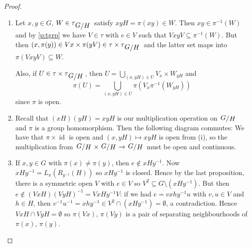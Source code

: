 \documentclass[11pt, a4paper]{memoir}
\theoremstyle{change}
\theoremstyle{plain}
\theoremstyle{nonumberplain}
\newtheorem{proof}{Proof}
\DeclareMathOperator{\id}{id}
\newcommand{\quot}[2]{\mathchoice{\left.\raisebox{0.14em}{$#1$}\middle/\raisebox{-0.14em}{$#2$}\right.}
                                 {\left.\raisebox{0.08em}{$#1$}\middle/\raisebox{-0.08em}{$#2$}\right.}
                                 {\left.\raisebox{0.03em}{$#1$}\middle/\raisebox{-0.03em}{$#2$}\right.}
                                 {\left.\raisebox{0em}{$#1$}\middle/\raisebox{0em}{$#2$}\right.}}
\numberwithin{equation}{section}
\begin{document}
\begin{proof}
    \begin{enumerate}[nl,r]
        \item Let $x,y\in G$, $W\in\tau_{\quot{G}{H}}$ satisfy $xyH=\pi(xy)\in W$.
            Then $xy\in\pi^{-1}(W)$ and by \cref{p:tgrp} we have $V\in\tau$ with $e\in V$ such that $VxyV\subseteq \pi^{-1}(W)$.
            But then $(x,\pi(y))\in Vx\times\pi(yV)\in \tau\times\tau_{\quot{G}{H}}$ and the latter set maps into $\pi(VxyV)\subseteq W$.

            Also, if $U\in\tau\times\tau_{\quot{G}{H}}$, then $U=\bigcup_{(x,yH)\in U}V_x\times W_{yH}$ and
            \begin{equation*}
                \pi(U)=\bigcup_{(x,yH)\in U}\pi(V_x\pi^{-1}(W_{yH}))
            \end{equation*}
            since $\pi$ is open.
        \item Recall that $(xH)(yH)=xyH$ is our multiplication operation on $\quot{G}{H}$ and $\pi$ is a group homomorphism.
            Then the following diagram commutes:
            We have that $\pi\times\id$ is open and $(x,yH)\mapsto xyH$ is open from (i), so the multiplication from $\quot{G}{H}\times\quot{G}{H}\to\quot{G}{H}$ must be open and continuous.
        \item If $x,y\in G$ with $\pi(x)\neq\pi(y)$, then $e\notin xHy^{-1}$.
            Now $xHy^{-1}=L_x(R_{y^{-1}}(H))$ so $xHy^{-1}$ is closed.
            Hence by the last proposition, there is a symmetric open $V$ with $e\in V$ so $V^2\subseteq G\setminus(xHy^{-1})$.
            But then $e\notin (VxH)(VyH)^{-1}=VxHy^{-1}V$: if we had $e=vxhy^{-1}u$ with $v,u\in V$ and $h\in H$, then $v^{-1}u^{-1}=xhy^{-1}\in V^2\cap(xHy^{-1})=\emptyset$, a contradiction.
            Hence $VxH\cap VyH=\emptyset$ so $\pi(Vx)$, $\pi(Vy)$ is a pair of separating neighbourhoods of $\pi(x)$, $\pi(y)$.
    \end{enumerate}
\end{proof}
\end{document}
